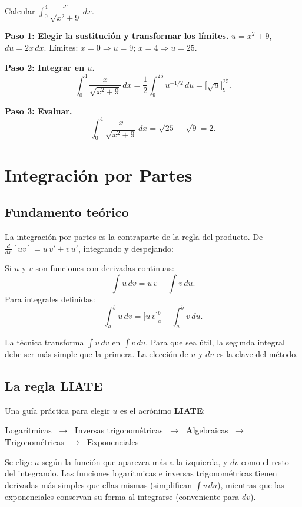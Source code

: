 \begin{example}
Calcular $\displaystyle\int_0^4 \dfrac{x}{\sqrt{x^2+9}}\, dx$.

\begin{myproof}

\textbf{Paso 1: Elegir la sustitución y transformar los límites.}
$u = x^2+9$, $du = 2x\,dx$. Límites: $x=0 \Rightarrow u=9$; $x=4 \Rightarrow u=25$.

\textbf{Paso 2: Integrar en $u$.}
\[
\int_0^4 \frac{x}{\sqrt{x^2+9}}\, dx
= \frac{1}{2}\int_9^{25} u^{-1/2}\, du
= \Big[\sqrt{u}\Big]_9^{25}.
\]

\textbf{Paso 3: Evaluar.}
\[
\boxed{\int_0^4 \frac{x}{\sqrt{x^2+9}}\, dx = \sqrt{25} - \sqrt{9} = 2.}
\]
\end{myproof}
\end{example}

\section{Integración por Partes}

\subsection{Fundamento teórico}

La integración por partes es la contraparte de la regla del producto. De
$\frac{d}{dx}[uv] = u\,v' + v\,u'$, integrando y despejando:

\begin{theorem}
Si $u$ y $v$ son funciones con derivadas continuas:
\[
\int u\, dv = u\,v - \int v\, du.
\]
Para integrales definidas:
\[
\int_a^b u\, dv = \Big[u\,v\Big]_a^b - \int_a^b v\, du.
\]
\end{theorem}

La técnica transforma $\int u\,dv$ en $\int v\,du$. Para que sea útil, la
segunda integral debe ser más simple que la primera. La elección de $u$ y
$dv$ es la clave del método.

\subsection{La regla LIATE}

Una guía práctica para elegir $u$ es el acrónimo \textbf{LIATE}:
\begin{center}
\textbf{L}ogarítmicas $\;\to\;$
\textbf{I}nversas trigonométricas $\;\to\;$
\textbf{A}lgebraicas $\;\to\;$
\textbf{T}rigonométricas $\;\to\;$
\textbf{E}xponenciales
\end{center}
Se elige $u$ según la función que aparezca más a la izquierda, y $dv$ como
el resto del integrando. Las funciones logarítmicas e inversas trigonométricas
tienen derivadas más simples que ellas mismas (simplifican $\int v\,du$),
mientras que las exponenciales conservan su forma al integrarse (conveniente
para $dv$).

